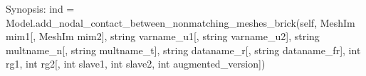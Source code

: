 \documentclass[a4paper,11pt,english]{sphinxmanual}
\begin{document}
\begin{fulllineitems}
\begin{fulllineitems}
\end{fulllineitems}


\begin{fulllineitems}
\label{\detokenize{python/cmdref_Model:getfem.Model.add_nodal_contact_between_nonmatching_meshes_brick}}
Synopsis: ind = Model.add\_nodal\_contact\_between\_nonmatching\_meshes\_brick(self,  MeshIm mim1{[}, MeshIm mim2{]}, string varname\_u1{[}, string varname\_u2{]}, string multname\_n{[}, string multname\_t{]}, string dataname\_r{[}, string dataname\_fr{]}, int rg1, int rg2{[}, int slave1, int slave2,  int augmented\_version{]})


\end{fulllineitems}
\end{fulllineitems}
\end{document}
